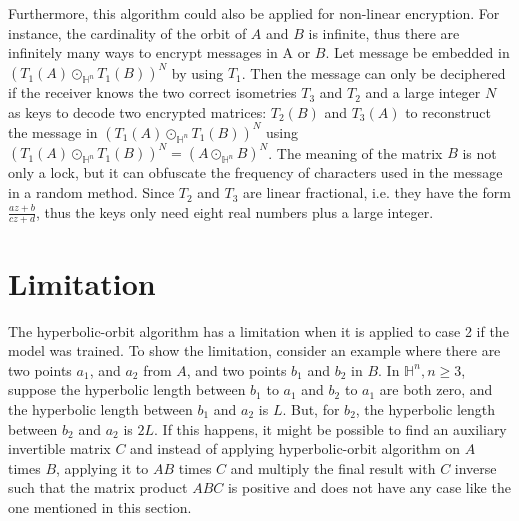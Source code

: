 \documentclass{article}
\theoremstyle{plain}
\theoremstyle{plain} %
\theoremstyle{definition}  %
\theoremstyle{remark}  %
\theoremstyle{plain}
\begin{document}
Furthermore, this algorithm could also be applied for non-linear encryption. For instance, the cardinality of the orbit of $A$ and $B$ is infinite, thus there are infinitely many ways to encrypt messages in A or $B$. Let message be embedded in $(T_1(A)\odot_{\mathbb{H}^n}T_1(B))^N$ by using $T_1$. Then the message can only be deciphered if the receiver knows the two correct isometries $T_3$ and $T_2$ and a large integer $N$ as keys to decode two encrypted matrices: $T_2(B)$ and $T_3(A)$ to reconstruct the message in $(T_1(A)\odot_{\mathbb{H}^n}T_1(B))^N$ using $(T_1(A)\odot_{\mathbb{H}^n}T_1(B))^N = (A\odot_{\mathbb{H}^n}B)^N$. The meaning of the matrix $B$ is not only a lock, but it can obfuscate the frequency of characters used in the message in a random method. Since $T_2$ and $T_3$ are linear fractional, i.e. they have the form $\frac{az+b}{cz+d}$, thus the keys only need eight real numbers plus a large integer.

\section{Limitation}
The hyperbolic-orbit algorithm has a limitation when it is applied to case 2 if the model was trained. To show the limitation, consider an example where there are two points $a_1$, and $a_2$ from $A$, and two points $b_1$ and $b_2$ in $B$. In $\mathbb{H}^n, n\geq 3$, suppose the hyperbolic length between $b_1$ to $a_1$ and $b_2$ to $a_1$ are both zero, and the hyperbolic length between $b_1$ and $a_2$ is $L$. But, for $b_2$, the hyperbolic length between $b_2$ and $a_2$ is $2L$. If this happens, it might be possible to find an auxiliary invertible matrix $C$ and instead of applying hyperbolic-orbit algorithm on $A$ times $B$, applying it to $AB$ times $C$ and multiply the final result with $C$ inverse such that the matrix product $ABC$ is positive and does not have any case like the one mentioned in this section. %

\end{document}
